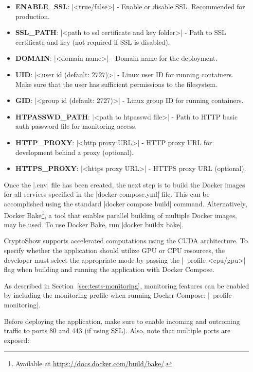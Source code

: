 \begin{itemize}
    \item \textbf{ENABLE\_SSL}: \inline|<true/false>| - Enable or disable SSL. Recommended for production.
    \item \textbf{SSL\_PATH}: \inline|<path to ssl certificate and key folder>| - Path to SSL certificate and key (not required if SSL is disabled).
    \item \textbf{DOMAIN}: \inline|<domain name>| - Domain name for the deployment.
    \item \textbf{UID}: \inline|<user id (default: 2727)>| - Linux user ID for running containers. Make sure that the user has sufficient permissions to the filesystem.
    \item \textbf{GID}: \inline|<group id (default: 2727)>| - Linux group ID for running containers.
    \item \textbf{HTPASSWD\_PATH}: \inline|<path to htpasswd file>| - Path to HTTP basic auth password file for monitoring access.
    \item \textbf{HTTP\_PROXY}: \inline|<http proxy URL>| - HTTP proxy URL for development behind a proxy (optional).
    \item \textbf{HTTPS\_PROXY}: \inline|<https proxy URL>| - HTTPS proxy URL (optional).
\end{itemize}

Once the \inline|.env| file has been created, the next step is to build the Docker images for all services specified in the \inline|docker-compose.yml| file. This can be accomplished using the standard \inline|docker compose build| command. Alternatively, Docker Bake\footnote{Available at \url{https://docs.docker.com/build/bake/}.}, a tool that enables parallel building of multiple Docker images, may be used. To use Docker Bake, run \inline|docker buildx bake|.

CryptoShow supports accelerated computations using the CUDA architecture. To specify whether the application should utilize GPU or CPU resources, the developer must select the appropriate mode by passing the \inline|--profile <cpu/gpu>| flag when building and running the application with Docker Compose.

As described in Section~\ref{sec:tests-monitoring}, monitoring features can be enabled by including the monitoring profile when running Docker Compose: \inline|--profile monitoring|.

Before deploying the application, make sure to enable incoming and outcoming traffic to ports 80 and 443 (if using SSL). Also, note that multiple ports are exposed:


